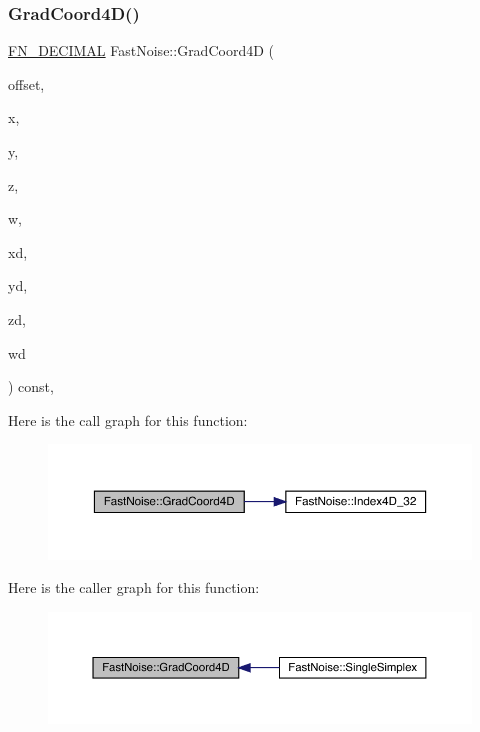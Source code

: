 \subsubsection{\texorpdfstring{Grad\+Coord4\+D()}{GradCoord4D()}}
{\footnotesize\ttfamily \mbox{\hyperlink{_fast_noise_8h_a75a9ef6d2541c4921815b885bfd449c3}{F\+N\+\_\+\+D\+E\+C\+I\+M\+AL}} Fast\+Noise\+::\+Grad\+Coord4D (\begin{DoxyParamCaption}\item[{unsigned char}]{offset,  }\item[{int}]{x,  }\item[{int}]{y,  }\item[{int}]{z,  }\item[{int}]{w,  }\item[{\mbox{\hyperlink{_fast_noise_8h_a75a9ef6d2541c4921815b885bfd449c3}{F\+N\+\_\+\+D\+E\+C\+I\+M\+AL}}}]{xd,  }\item[{\mbox{\hyperlink{_fast_noise_8h_a75a9ef6d2541c4921815b885bfd449c3}{F\+N\+\_\+\+D\+E\+C\+I\+M\+AL}}}]{yd,  }\item[{\mbox{\hyperlink{_fast_noise_8h_a75a9ef6d2541c4921815b885bfd449c3}{F\+N\+\_\+\+D\+E\+C\+I\+M\+AL}}}]{zd,  }\item[{\mbox{\hyperlink{_fast_noise_8h_a75a9ef6d2541c4921815b885bfd449c3}{F\+N\+\_\+\+D\+E\+C\+I\+M\+AL}}}]{wd }\end{DoxyParamCaption}) const\hspace{0.3cm}{\ttfamily [inline]}, {\ttfamily [private]}}

Here is the call graph for this function\+:
\nopagebreak
\begin{figure}[H]
\begin{center}
\leavevmode
\includegraphics[width=350pt]{class_fast_noise_a96464d203e3868b31bcd9248f32ae259_cgraph}
\end{center}
\end{figure}
Here is the caller graph for this function\+:
\nopagebreak
\begin{figure}[H]
\begin{center}
\leavevmode
\includegraphics[width=350pt]{class_fast_noise_a96464d203e3868b31bcd9248f32ae259_icgraph}
\end{center}
\end{figure}
\mbox{\label{class_fast_noise_a84d51e4e3c6abb7897954a4e77194e03}} 
